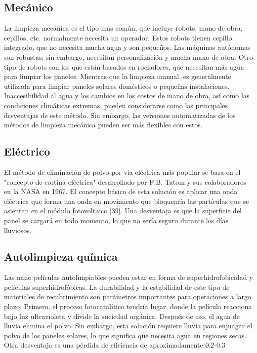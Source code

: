 \subsection{Mecánico}
La limpieza mecánica es el tipo más común, que incluye robots, mano de obra, cepillos, etc. normalmente necesita un operador. Estos robots tienen cepillo integrado, que no necesita mucha agua y son pequeños. Las máquinas autónomas son robustas; sin embargo, necesitan personalización y mucha mano de obra. Otro tipo de robots son los que están basados en rociadores, que necesitan más agua para limpiar los paneles. Mientras que la limpieza manual, es generalmente utilizada para limpiar paneles solares domésticos o pequeñas instalaciones. Inaccesibilidad al agua y los cambios en los costos de mano de obra, así como las condiciones climáticas extremas, pueden considerarse como las principales desventajas de este método. Sin embargo, las versiones automatizadas de los métodos de limpieza mecánica pueden ser más flexibles con estos.
\subsection{Eléctrico}
El método de eliminación de polvo por vía eléctrica más popular se basa en el "concepto de cortina eléctrica" desarrollado por F.B. Tatom y sus colaboradores en la NASA en 1967.
El concepto básico de esta solución es aplicar una onda eléctrica que forma una onda en movimiento que bloquearía las partículas que se asientan en el módulo fotovoltaico [39]. Una desventaja es que la superficie del panel se cargará en todo momento, lo que no sería seguro durante los días lluviosos.

\subsection{Autolimpieza química}
Las nano películas autolimpiables pueden estar en forma de superhidrofobicidad y películas superhidrofóbicas. La durabilidad y la estabilidad de este tipo de materiales de recubrimiento son parámetros importantes para operaciones a largo plazo. Primero, el proceso fotocatalítico tendría lugar, donde la película reacciona bajo luz ultravioleta y divide la suciedad orgánica. Después de eso, el agua de lluvia elimina el polvo. Sin embargo, esta solución requiere lluvia para enjuagar el polvo de los paneles solares, lo que significa que necesita agua en regiones secas. Otra desventaja es una pérdida de eficiencia de aproximadamente 0.2-0.3%
